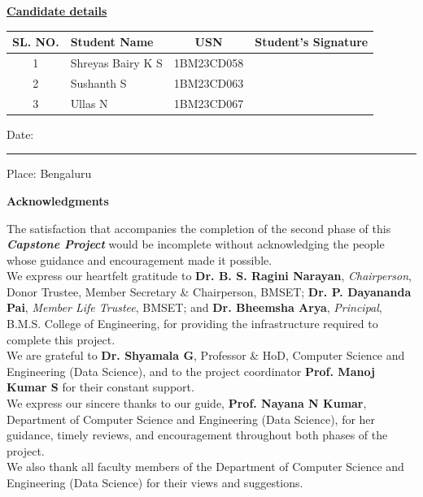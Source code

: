 \documentclass[12pt,a4paper]{report}
\theoremstyle{definition}
\theoremstyle{remark}
\begin{document}
\begin{center}
    \textbf{\underline{Candidate details}}
\end{center}

\begin{center}
\begin{tabularx}{\textwidth}{|c|X|c|c|}
    \hline
    \textbf{SL. NO.} & \textbf{Student Name} & \textbf{USN} & \textbf{Student's Signature} \\
    \hline
    1 & Shreyas Bairy K S & 1BM23CD058 & \\
    \hline
    2 & Sushanth S & 1BM23CD063 & \\
    \hline
    3 & Ullas N & 1BM23CD067 & \\
    \hline
\end{tabularx}
\end{center}

\vspace{1.2cm}
\begin{flushleft}
    Date: \rule{4cm}{0.4pt} \hfill Place: Bengaluru
\end{flushleft}

\newpage
\pagestyle{romanstyle}
\begin{center}
\textbf{\Large Acknowledgments}
\end{center}

\noindent The satisfaction that accompanies the completion of the second phase of this \textit{\textbf{Capstone Project}} would be incomplete without acknowledging the people whose guidance and encouragement made it possible.\\
\noindent We express our heartfelt gratitude to \textbf{Dr. B. S. Ragini Narayan}, \textit{Chairperson}, Donor Trustee, Member Secretary \& Chairperson, BMSET; \textbf{Dr. P. Dayananda Pai}, \textit{Member Life Trustee}, BMSET; and \textbf{Dr. Bheemsha Arya}, \textit{Principal}, B.M.S. College of Engineering, for providing the infrastructure required to complete this project.\\
\noindent We are grateful to \textbf{Dr. Shyamala G}, Professor \& HoD, Computer Science and Engineering (Data Science), and to the project coordinator \textbf{Prof. Manoj Kumar S} for their constant support.\\
\noindent We express our sincere thanks to our guide, \textbf{Prof. Nayana N Kumar}, Department of Computer Science and Engineering (Data Science), for her guidance, timely reviews, and encouragement throughout both phases of the project.\\
\noindent We also thank all faculty members of the Department of Computer Science and Engineering (Data Science) for their views and suggestions.
\end{document}
